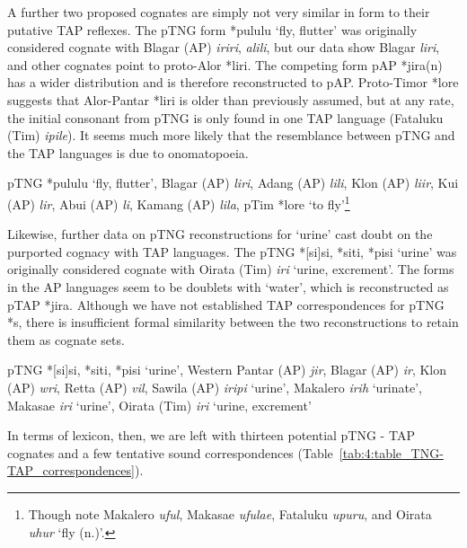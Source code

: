 A further two proposed cognates are simply not very similar in form to their putative TAP reflexes. The pTNG form *pululu `fly, flutter' was originally considered cognate with Blagar (AP) \textit{iriri}, \textit{alili}, but our data show Blagar \textit{liri}, and other cognates point to proto-Alor *liri. The competing form pAP *jira(n) has a wider distribution and is therefore reconstructed to pAP. Proto-Timor *lore suggests that Alor-Pantar *liri is older than previously assumed, but at any rate, the initial consonant from pTNG is only found in one TAP language (Fataluku (Tim) \textit{ipile}). It seems much more likely that the resemblance between pTNG and the TAP languages is due to onomatopoeia.

\ea%
\label{ex:4:54}
\upshape    pTNG *pululu `fly, flutter', Blagar (AP) \textit{liri}, Adang (AP) \textit{lili}\textit{{\textglotstop}}, Klon (AP) \textit{liir}, Kui (AP) \textit{lir}, Abui (AP) \textit{li}\textit{{\textglotstop}}, Kamang (AP) \textit{lila}, pTim *lore `to fly'\footnote{Though note Makalero \textit{uful}, Makasae \textit{ufulae}, Fataluku \textit{upuru}, and Oirata \textit{uhur} `fly (n.)'. }  
\z

Likewise, further data on pTNG reconstructions for `urine' cast doubt on the purported cognacy with TAP languages. The pTNG *[si]si, *siti, *pisi `urine' was originally considered cognate with Oirata (Tim) \textit{iri} `urine, excrement'. The forms in the AP languages seem to be doublets with `water', which is reconstructed as pTAP *jira. Although we have not established TAP correspondences for pTNG *s, there is insufficient formal similarity between the two reconstructions to retain them as cognate sets.

\ea%
\label{ex:4:55}
\upshape    pTNG *[si]si, *siti, *pisi `urine', Western Pantar (AP) \textit{jir}, Blagar (AP) \textit{ir}, Klon (AP) \textit{wri}, Retta (AP) \textit{vil}, Sawila (AP) \textit{iripi{\ng}} `urine', Makalero \textit{irih }`urinate', Makasae \textit{iri }`urine', Oirata (Tim) \textit{iri} `urine, excrement'  
\z

In terms of lexicon, then, we are left with thirteen potential pTNG - TAP cognates and a few tentative sound correspondences (Table~\ref{tab:4:table_TNG-TAP_correspondences}).


